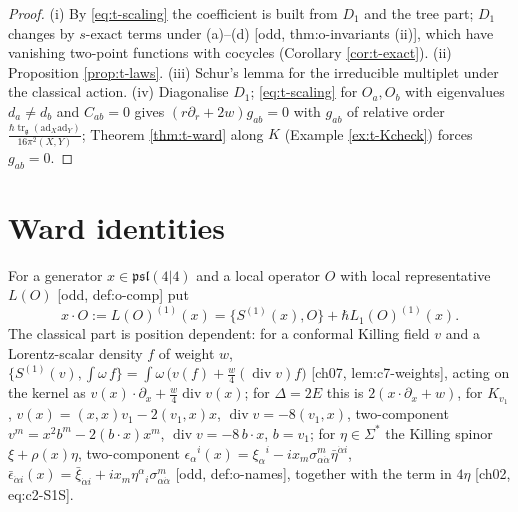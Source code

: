 \documentclass[11pt]{report}
\theoremstyle{plain}
\theoremstyle{definition}
\numberwithin{equation}{chapter}
\newcommand{\unit}{\tfrac{\hbar\operatorname{tr}_{\mathfrak g}(\mathrm{ad}_X\mathrm{ad}_Y)}{16\pi^2(X,Y)}}
\begin{document}
\begin{proof}
(i) By \eqref{eq:t-scaling} the coefficient is built from $D_1$ and the tree part; $D_1$ changes by $s$-exact terms under (a)--(d) [odd, thm:o-invariants (ii)], which have vanishing two-point functions with cocycles (Corollary \ref{cor:t-exact}). (ii) Proposition \ref{prop:t-laws}. (iii) Schur's lemma for the irreducible multiplet under the classical action. (iv) Diagonalise $D_1$; \eqref{eq:t-scaling} for $O_a,O_b$ with eigenvalues $d_a\neq d_b$ and $C_{ab}=0$ gives $(r\partial_r+2w)g_{ab}=0$ with $g_{ab}$ of relative order $\unit$; Theorem \ref{thm:t-ward} along $K$ (Example \ref{ex:t-Kcheck}) forces $g_{ab}=0$.
\end{proof}
\section{Ward identities}

For a generator $x\in\mathfrak{psl}(4|4)$ and a local operator $O$ with local representative $L(O)$ [odd, def:o-comp] put
\begin{equation}
x\cdot O:=L(O)^{(1)}(x)=\{S^{(1)}(x),O\}+\hbar L_1(O)^{(1)}(x).
\label{eq:t-action}
\end{equation}
The classical part is position dependent: for a conformal Killing field $v$ and a Lorentz-scalar density $f$ of weight $w$, $\{S^{(1)}(v),\int\omega\,f\}=\int\omega\,\big(v(f)+\tfrac w4(\operatorname{div}v)f\big)$ [ch07, lem:c7-weights], acting on the kernel as $v(x)\cdot\partial_x+\tfrac w4\operatorname{div}v(x)$; for $\Delta=2E$ this is $2(x\cdot\partial_x+w)$, for $K_{v_1}$, $v(x)=(x,x)v_1-2(v_1,x)x$, $\operatorname{div}v=-8(v_1,x)$, two-component $v^m=x^2b^m-2(b\cdot x)x^m$, $\operatorname{div}v=-8\,b\cdot x$, $b=v_1$; for $\eta\in\Sigma^*$ the Killing spinor $\xi+\rho(x)\eta$, two-component $\epsilon_\alpha{}^i(x)=\xi_\alpha{}^i-ix_m\sigma^m_{\alpha\dot\alpha}\bar\eta^{\dot\alpha i}$, $\bar\epsilon_{\dot\alpha i}(x)=\bar\xi_{\dot\alpha i}+ix_m\eta^\alpha{}_i\sigma^m_{\alpha\dot\alpha}$ [odd, def:o-names], together with the term in $4\eta$ [ch02, eq:c2-S1S].
\end{document}
